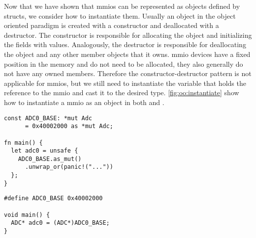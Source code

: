 Now that we have shown that \glspl{mmio} can be represented as objects defined by structs, we consider how to instantiate them.
Usually an object in the object oriented paradigm is created with a constructor and deallocated with a destructor.
The constructor is responsible for allocating the object and initializing the fields with values.
Analogously, the destructor is responsible for deallocating the object and any other member objects that it owns.
\gls{mmio} devices have a fixed position in the memory and do not need to be allocated, they also generally do not have any owned members.
Therefore the constructor-destructor pattern is not applicable for \gls{mmio}s, but we still need to instantiate the variable that holds the reference to the \gls{mmio} and cast it to the desired type.
\autoref{fig:oo:instantiate} show how to instantiate a \gls{mmio} as an object in both {\C} and {\rust}.

\begin{listing}[H]
  \begin{minipage}{0.47\textwidth}
  \begin{listing}
    \begin{verbatim}
const ADC0_BASE: *mut Adc
      = 0x40002000 as *mut Adc;

fn main() {
  let adc0 = unsafe {
    ADC0_BASE.as_mut()
      .unwrap_or(panic!("..."))
  };
}
    \end{verbatim}
  \end{listing}
  \end{minipage}
  \hfill
  \begin{minipage}{0.47\textwidth}
  \begin{listing}
    \begin{verbatim}
#define ADC0_BASE 0x40002000

void main() {
  ADC* adc0 = (ADC*)ADC0_BASE;
}
    \end{verbatim}
  \end{listing}
  \end{minipage}
  \caption{Instantiating \glspl{mmio} in {\rust} and C, respectively.}
  \label{fig:oo:instantiate}
\end{listing}

